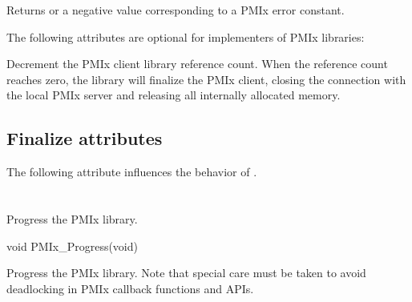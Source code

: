 \begin{arglist}
\end{arglist}

Returns  or a negative value corresponding to a PMIx error constant.

\optattrstart
The following attributes are optional for implementers of \ac{PMIx} libraries:

\optattrend

\descr

Decrement the \ac{PMIx} client library reference count.
When the reference count reaches zero, the library will finalize the \ac{PMIx} client, closing the connection with the local \ac{PMIx} server and releasing all internally allocated memory.

\subsection{Finalize attributes}

The following attribute influences the behavior of .

%


\section{}

\summary

Progress the \ac{PMIx} library.

\format

\cspecificstart
\begin{codepar}
void
PMIx_Progress(void)
\end{codepar}
\cspecificend


\descr

Progress the \ac{PMIx} library. Note that special care must be taken to avoid deadlocking in \ac{PMIx} callback functions and \acp{API}.

